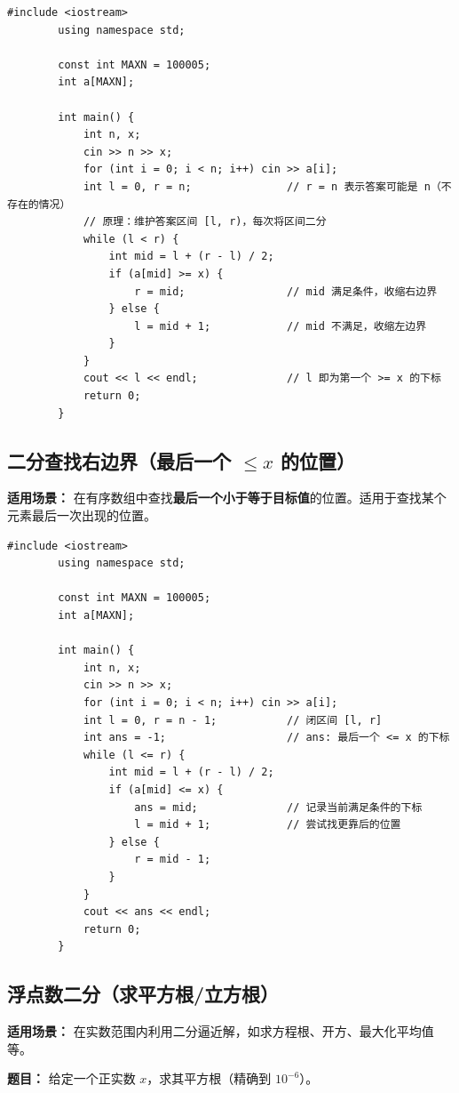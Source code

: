 \documentclass[12pt,a4paper]{ctexart}
\begin{document}
	\begin{lstlisting}[caption={二分查找——第一个大于等于 x 的位置（lower\_bound）}]
		#include <iostream>
		using namespace std;
		
		const int MAXN = 100005;
		int a[MAXN];
		
		int main() {
			int n, x;
			cin >> n >> x;
			for (int i = 0; i < n; i++) cin >> a[i];
			int l = 0, r = n;               // r = n 表示答案可能是 n（不存在的情况）
			// 原理：维护答案区间 [l, r)，每次将区间二分
			while (l < r) {
				int mid = l + (r - l) / 2;
				if (a[mid] >= x) {
					r = mid;                // mid 满足条件，收缩右边界
				} else {
					l = mid + 1;            // mid 不满足，收缩左边界
				}
			}
			cout << l << endl;              // l 即为第一个 >= x 的下标
			return 0;
		}
	\end{lstlisting}
	
	\subsection{二分查找右边界（最后一个 \(\le x\) 的位置）}
	\textbf{适用场景：} 在有序数组中查找\textbf{最后一个小于等于目标值}的位置。适用于查找某个元素最后一次出现的位置。
	
	\begin{lstlisting}[caption={二分查找——最后一个小于等于 x 的位置}]
		#include <iostream>
		using namespace std;
		
		const int MAXN = 100005;
		int a[MAXN];
		
		int main() {
			int n, x;
			cin >> n >> x;
			for (int i = 0; i < n; i++) cin >> a[i];
			int l = 0, r = n - 1;           // 闭区间 [l, r]
			int ans = -1;                   // ans: 最后一个 <= x 的下标
			while (l <= r) {
				int mid = l + (r - l) / 2;
				if (a[mid] <= x) {
					ans = mid;              // 记录当前满足条件的下标
					l = mid + 1;            // 尝试找更靠后的位置
				} else {
					r = mid - 1;
				}
			}
			cout << ans << endl;
			return 0;
		}
	\end{lstlisting}
	
	\subsection{浮点数二分（求平方根/立方根）}
	\textbf{适用场景：} 在实数范围内利用二分逼近解，如求方程根、开方、最大化平均值等。
	
	\textbf{题目：} 给定一个正实数 \(x\)，求其平方根（精确到 \(10^{-6}\)）。
	
\end{document}
